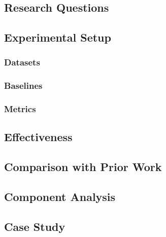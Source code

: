 \placeholder

\subsection{Research Questions}
\placeholder

\subsection{Experimental Setup}
\placeholder

\subsubsection{Datasets}
\placeholder

\subsubsection{Baselines}
\placeholder

\subsubsection{Metrics}
\placeholder

\subsection{Effectiveness}
\placeholder

\subsection{Comparison with Prior Work}
\placeholder

\subsection{Component Analysis}
\placeholder

\subsection{Case Study}
\placeholder